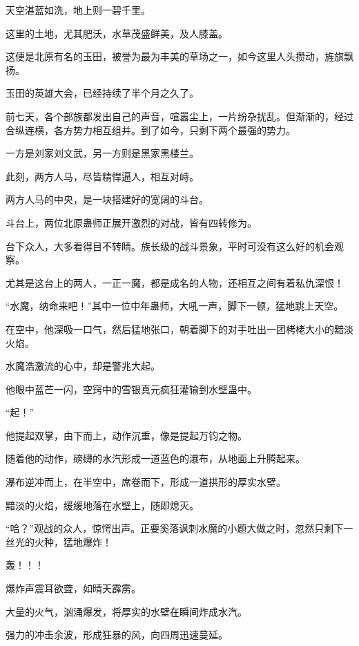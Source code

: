 
\begin{this_body}

天空湛蓝如洗，地上则一碧千里。

这里的土地，尤其肥沃，水草茂盛鲜美，及人膝盖。

这便是北原有名的玉田，被誉为最为丰美的草场之一，如今这里人头攒动，旌旗飘扬。

玉田的英雄大会，已经持续了半个月之久了。

前七天，各个部族都发出自己的声音，喧嚣尘上，一片纷杂扰乱。但渐渐的，经过合纵连横，各方势力相互组并。到了如今，只剩下两个最强的势力。

一方是刘家刘文武，另一方则是黑家黑楼兰。

此刻，两方人马，尽皆精悍逼人，相互对峙。

两方人马的中央，是一块搭建好的宽阔的斗台。

斗台上，两位北原蛊师正展开激烈的对战，皆有四转修为。

台下众人，大多看得目不转睛。族长级的战斗景象，平时可没有这么好的机会观察。

尤其是这台上的两人，一正一魔，都是成名的人物，还相互之间有着私仇深恨！

“水魔，纳命来吧！”其中一位中年蛊师，大吼一声，脚下一顿，猛地跳上天空。

在空中，他深吸一口气，然后猛地张口，朝着脚下的对手吐出一团栲栳大小的黯淡火焰。

水魔浩激流的心中，却是警兆大起。

他眼中蓝芒一闪，空窍中的雪银真元疯狂灌输到水壁蛊中。

“起！”

他提起双掌，由下而上，动作沉重，像是提起万钧之物。

随着他的动作，磅礴的水汽形成一道蓝色的瀑布，从地面上升腾起来。

瀑布逆冲而上，在半空中，席卷而下，形成一道拱形的厚实水壁。

黯淡的火焰，缓缓地落在水壁上，随即熄灭。

“哈？”观战的众人，惊愕出声。正要奚落讽刺水魔的小题大做之时，忽然只剩下一丝光的火种，猛地爆炸！

轰！！！

爆炸声震耳欲聋，如晴天霹雳。

大量的火气，汹涌爆发，将厚实的水壁在瞬间炸成水汽。

强力的冲击余波，形成狂暴的风，向四周迅速蔓延。


\end{this_body}

